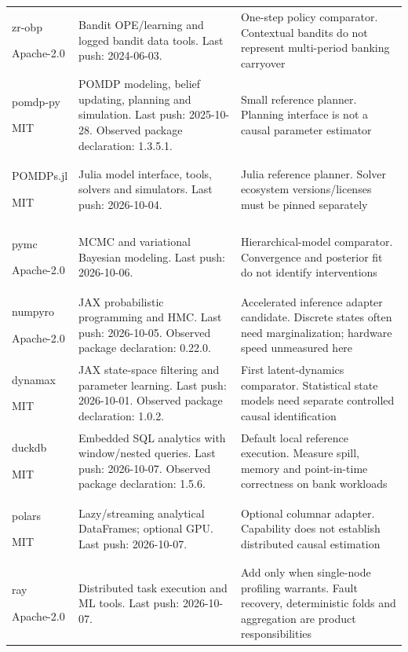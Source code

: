 \begin{longtable}{P{29mm}P{55mm}P{60mm}}
zr-obp \citep{sw_obp}\par Apache-2.0 & Bandit OPE/learning and logged bandit data tools. Last push: 2024-06-03. & One-step policy comparator. Contextual bandits do not represent multi-period banking carryover\\
pomdp-py \citep{sw_pomdp_py}\par MIT & POMDP modeling, belief updating, planning and simulation. Last push: 2025-10-28. Observed package declaration: 1.3.5.1. & Small reference planner. Planning interface is not a causal parameter estimator\\
POMDPs.jl \citep{sw_pomdps}\par MIT & Julia model interface, tools, solvers and simulators. Last push: 2026-10-04. & Julia reference planner. Solver ecosystem versions/licenses must be pinned separately\\
pymc \citep{sw_pymc}\par Apache-2.0 & MCMC and variational Bayesian modeling. Last push: 2026-10-06. & Hierarchical-model comparator. Convergence and posterior fit do not identify interventions\\
numpyro \citep{sw_numpyro}\par Apache-2.0 & JAX probabilistic programming and HMC. Last push: 2026-10-05. Observed package declaration: 0.22.0. & Accelerated inference adapter candidate. Discrete states often need marginalization; hardware speed unmeasured here\\
dynamax \citep{sw_dynamax}\par MIT & JAX state-space filtering and parameter learning. Last push: 2026-10-01. Observed package declaration: 1.0.2. & First latent-dynamics comparator. Statistical state models need separate controlled causal identification\\
duckdb \citep{sw_duckdb}\par MIT & Embedded SQL analytics with window/nested queries. Last push: 2026-10-07. Observed package declaration: 1.5.6. & Default local reference execution. Measure spill, memory and point-in-time correctness on bank workloads\\
polars \citep{sw_polars}\par MIT & Lazy/streaming analytical DataFrames; optional GPU. Last push: 2026-10-07. & Optional columnar adapter. Capability does not establish distributed causal estimation\\
ray \citep{sw_ray}\par Apache-2.0 & Distributed task execution and ML tools. Last push: 2026-10-07. & Add only when single-node profiling warrants. Fault recovery, deterministic folds and aggregation are product responsibilities\\

\end{longtable}

